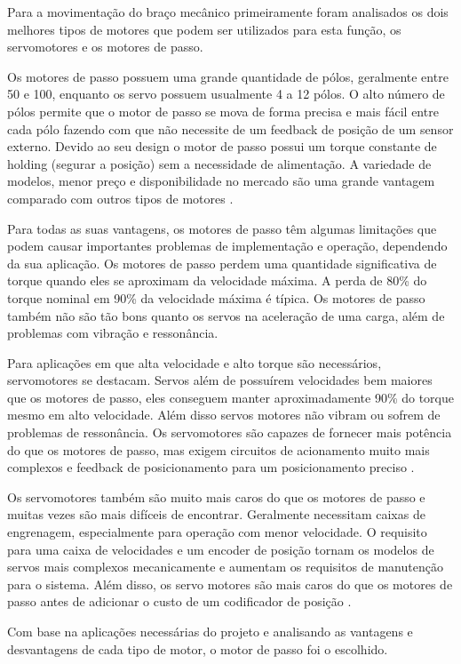 Para a movimentação do braço mecânico primeiramente foram analisados os dois melhores tipos de motores que podem ser utilizados para esta função, os servomotores e os motores de passo.

Os motores de passo possuem uma grande quantidade de pólos, geralmente entre 50 e 100, enquanto os servo possuem usualmente 4 a 12 pólos. O alto número de pólos permite que o motor de passo se mova de forma precisa e mais fácil entre cada pólo fazendo com que não necessite de um feedback de posição de um sensor externo. Devido ao seu design o motor de passo possui um torque constante de holding (segurar a posição) sem a necessidade de alimentação. A variedade de modelos, menor preço e disponibilidade no mercado são uma grande vantagem comparado com outros tipos de motores \cite{voss2008comprehensible}.

Para todas as suas vantagens, os motores de passo têm algumas limitações que podem causar importantes problemas de implementação e operação, dependendo da sua aplicação. Os motores de passo perdem uma quantidade significativa de torque quando eles se aproximam da velocidade máxima. A perda de 80\% do torque nominal em 90\% da velocidade máxima é típica. Os motores de passo também não são tão bons quanto os servos na aceleração de uma carga, além de problemas com vibração e ressonância.

Para aplicações em que alta velocidade e alto torque são necessários, servomotores se destacam. Servos além de possuírem velocidades bem maiores que os motores de passo, eles conseguem manter aproximadamente 90\% do torque mesmo em alto velocidade. Além disso servos motores não vibram ou sofrem de problemas de ressonância. Os servomotores são capazes de fornecer mais potência do que os motores de passo, mas exigem circuitos de acionamento muito mais complexos e feedback de posicionamento para um posicionamento preciso \cite{passovsservo}. 

Os servomotores também são muito mais caros do que os motores de passo e muitas vezes são mais difíceis de encontrar. Geralmente necessitam caixas de engrenagem, especialmente para operação com menor velocidade. O requisito para uma caixa de velocidades e um encoder de posição tornam os modelos de servos mais complexos mecanicamente e aumentam os requisitos de manutenção para o sistema. Além disso, os servo motores são mais caros do que os motores de passo antes de adicionar o custo de um codificador de posição \cite{passovsservo}.
               
Com base na aplicações necessárias do projeto e analisando as vantagens e desvantagens de cada tipo de motor, o motor de passo foi o escolhido.

